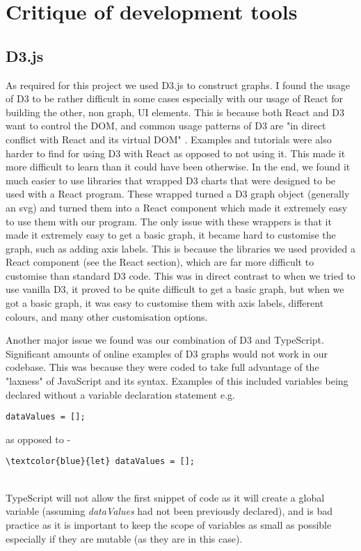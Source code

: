 \documentclass[10pt, journal]{IEEEtran}
\begin{document}
\section{Critique of development tools}
\subsection{D3.js}
As required for this project we used D3.js\cite{d3} to construct graphs. I found the usage of D3 to be rather difficult in some cases especially with our usage of React for building the other, non graph, UI elements. This is because both React and D3 want to control the DOM, and common usage patterns of D3 are "in direct conflict with React and its virtual DOM" \cite{meeks}. Examples and tutorials were also harder to find for using D3 with React as opposed to not using it. This made it more difficult to learn than it could have been otherwise. In the end, we found it much easier to use libraries that wrapped D3 charts that were designed to be used with a React program. These wrapped turned a D3 graph object (generally an svg) and turned them into a React component which made it extremely easy to use them with our program. The only issue with these wrappers is that it made it extremely easy to get a basic graph, it became hard to customise the graph, such as adding axis labels. This is because the libraries we used provided a React component (see the React section), which are far more difficult to customise than standard D3 code. This was in direct contrast to when we tried to use vanilla D3, it proved to be quite difficult to get a basic graph, but when we got a basic graph, it was easy to customise them with axis labels, different colours, and many other customisation options.

Another major issue we found was our combination of D3 and TypeScript. Significant amounts of online examples of D3 graphs would not work in our codebase. This was because they were coded to take full advantage of the "laxness" of JavaScript and its syntax. Examples of this included variables being declared without a variable declaration statement \cite{badcode} e.g.
\begin{verbatim}
dataValues = [];
\end{verbatim}

as opposed to -

\begin{Verbatim}[commandchars=\\\{\}]
\textcolor{blue}{let} dataValues = [];
\end{Verbatim}
~\\
TypeScript will not allow the first snippet of code as it will create a global variable (assuming \textit{dataValues} had not been previously declared), and is bad practice as it is important to keep the scope of variables as small as possible especially if they are mutable (as they are in this case). 
\end{document}
